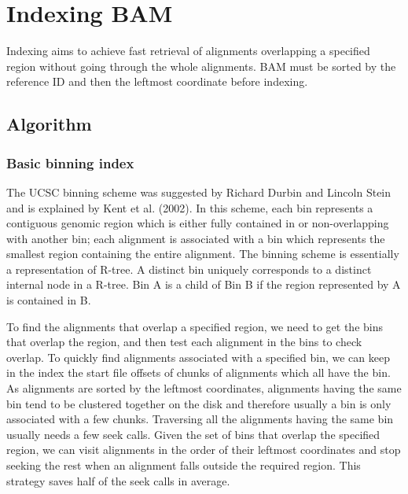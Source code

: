 \documentclass[10pt]{article}
\begin{document}

\pagebreak

\section{Indexing BAM}
Indexing aims to achieve fast retrieval of alignments overlapping a
specified region without going through the whole alignments. BAM must be
sorted by the reference ID and then the leftmost coordinate before
indexing.

\subsection{Algorithm}
\subsubsection{Basic binning index}
The UCSC binning scheme was suggested by Richard Durbin and Lincoln
Stein and is explained by Kent et al. (2002). In this scheme, each bin
represents a contiguous genomic region which is either fully contained
in or non-overlapping with another bin; each alignment is associated
with a bin which represents the smallest region containing the entire
alignment. The binning scheme is essentially a representation of
R-tree. A distinct bin uniquely corresponds to a distinct internal node
in a R-tree. Bin A is a child of Bin B if the region represented by A is
contained in B.

To find the alignments that overlap a specified region, we need to get
the bins that overlap the region, and then test each alignment in the
bins to check overlap. To quickly find alignments associated with a
specified bin, we can keep in the index the start file offsets of chunks
of alignments which all have the bin. As alignments are sorted by the
leftmost coordinates, alignments having the same bin tend to be
clustered together on the disk and therefore usually a bin is only
associated with a few chunks. Traversing all the alignments having the
same bin usually needs a few seek calls. Given the set of bins that
overlap the specified region, we can visit alignments in the order of
their leftmost coordinates and stop seeking the rest when an alignment
falls outside the required region. This strategy saves half of the seek
calls in average.
\end{document}
